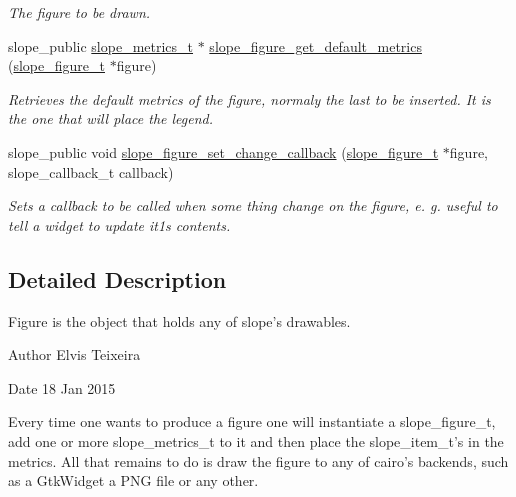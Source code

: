 \begin{DoxyCompactItemize}
\begin{DoxyCompactList}\small\item\em The figure to be drawn. \end{DoxyCompactList}\item 
slope\+\_\+public \hyperlink{group__Metrics_gab80787ee8ae8dc449e770249fe0e3c35}{slope\+\_\+metrics\+\_\+t} $\ast$ \hyperlink{group__Figure_gae97736e589280dfdd5446500c576887a}{slope\+\_\+figure\+\_\+get\+\_\+default\+\_\+metrics} (\hyperlink{group__Figure_ga507cc82eeca8255d6c0f603ffdaeb59e}{slope\+\_\+figure\+\_\+t} $\ast$figure)
\begin{DoxyCompactList}\small\item\em Retrieves the default metrics of the figure, normaly the last to be inserted. It is the one that will place the legend. \end{DoxyCompactList}\item 
slope\+\_\+public void \hyperlink{group__Figure_gad9907caa20c827f090b140e389f3c077}{slope\+\_\+figure\+\_\+set\+\_\+change\+\_\+callback} (\hyperlink{group__Figure_ga507cc82eeca8255d6c0f603ffdaeb59e}{slope\+\_\+figure\+\_\+t} $\ast$figure, slope\+\_\+callback\+\_\+t callback)
\begin{DoxyCompactList}\small\item\em Sets a callback to be called when some thing change on the figure, e. g. useful to tell a widget to update it1s contents. \end{DoxyCompactList}\end{DoxyCompactItemize}


\subsection{Detailed Description}
Figure is the object that holds any of slope's drawables. 

\begin{DoxyAuthor}{Author}
Elvis Teixeira 
\end{DoxyAuthor}
\begin{DoxyDate}{Date}
18 Jan 2015
\end{DoxyDate}
Every time one wants to produce a figure one will instantiate a slope\+\_\+figure\+\_\+t, add one or more slope\+\_\+metrics\+\_\+t to it and then place the slope\+\_\+item\+\_\+t's in the metrics. All that remains to do is draw the figure to any of cairo's backends, such as a Gtk\+Widget a P\+N\+G file or any other. 

